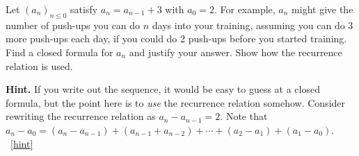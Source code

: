 \documentclass{book}
\begin{document}
\setcounter{project}{143}
\addtocounter{project}{-1}
\begin{activity}[]\label{act-arithmetic}
\hypertarget{p-938}{}%
Let \((a_n)_{n \le 0}\) satisfy \(a_n = a_{n-1} + 3\) with \(a_0 = 2\).  For example, \(a_n\) might give the number of push-ups you can do \(n\) days into your training, assuming you can do 3 more push-ups each day, if you could do 2 push-ups before you started training.  Find a closed formula for \(a_n\) and justify your answer.  Show how the recurrence relation is used.%
\par\smallskip%
\noindent\textbf{Hint.}\hypertarget{hint-102}{}\quad%
\hypertarget{p-939}{}%
If you write out the sequence, it would be easy to guess at a closed formula, but the point here is to \emph{use} the recurrence relation somehow.  Consider rewriting the recurrence relation as \(a_n - a_{n-1} = 2\).  Note that \(a_n - a_0 = (a_n - a_{n-1}) + (a_{n-1} + a_{n-2}) + \cdots + (a_2 - a_1) + (a_1 - a_0)\).%
~\hfill{\tiny\hyperlink{a-143}{[hint]}\hypertarget{q-143}{}}\end{activity}

\clearpage
\end{document}
